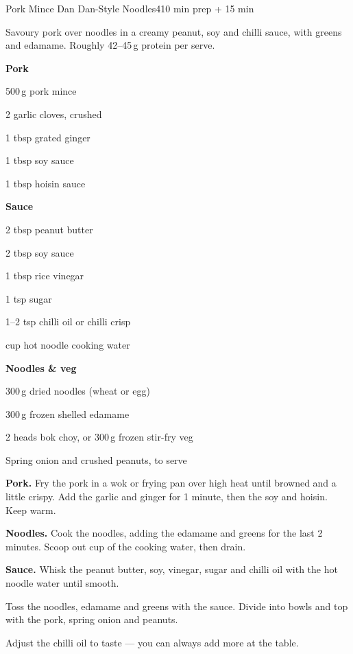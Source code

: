 \begin{recipebox}{Pork Mince Dan Dan-Style Noodles}{4}{10 min prep + 15 min}

Savoury pork over noodles in a creamy peanut, soy and chilli sauce, with greens
and edamame. Roughly 42--45\,g protein per serve.

\begin{ingredients}
  \item[] \textbf{Pork}
  \item 500\,g pork mince
  \item 2 garlic cloves, crushed
  \item 1 tbsp grated ginger
  \item 1 tbsp soy sauce
  \item 1 tbsp hoisin sauce
  \item[] \textbf{Sauce}
  \item 2 tbsp peanut butter
  \item 2 tbsp soy sauce
  \item 1 tbsp rice vinegar
  \item 1 tsp sugar
  \item 1--2 tsp chilli oil or chilli crisp
  \item {} cup hot noodle cooking water
  \item[] \textbf{Noodles \& veg}
  \item 300\,g dried noodles (wheat or egg)
  \item 300\,g frozen shelled edamame
  \item 2 heads bok choy, or 300\,g frozen stir-fry veg
  \item Spring onion and crushed peanuts, to serve
\end{ingredients}

\begin{method}
  \item \textbf{Pork.} Fry the pork in a wok or frying pan over high heat until browned and a little crispy. Add the garlic and ginger for 1 minute, then the soy and hoisin. Keep warm.
  \item \textbf{Noodles.} Cook the noodles, adding the edamame and greens for the last 2 minutes. Scoop out  cup of the cooking water, then drain.
  \item \textbf{Sauce.} Whisk the peanut butter, soy, vinegar, sugar and chilli oil with the hot noodle water until smooth.
  \item Toss the noodles, edamame and greens with the sauce. Divide into bowls and top with the pork, spring onion and peanuts.
\end{method}

\begin{notelist}
  \item Adjust the chilli oil to taste --- you can always add more at the table.
\end{notelist}

\end{recipebox}
